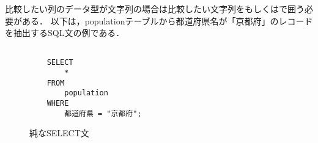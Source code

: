 比較したい列のデータ型が文字列の場合は比較したい文字列をもしくはで囲う必要がある．
以下は，populationテーブルから都道府県名が「京都府」のレコードを抽出するSQL文の例である．
\begin{figure}[tb]
    \begin{verbatim}

    SELECT
        *
    FROM
        population
    WHERE
        都道府県 = "京都府";
    \end{verbatim}
    \captionsetup{name=コード}
    \caption{純なSELECT文}
    \label{code:sql-where2}
\end{figure}
\begin{table}[tb]
    \centering
    \caption{}
    \label{tb:}
\end{table}

